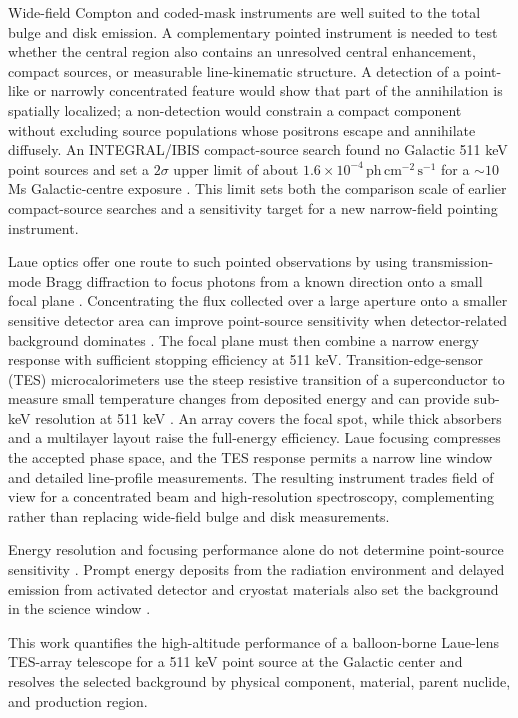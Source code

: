 \documentclass[11pt]{article}
\newcommand{\phcms}{\ensuremath{\,\mathrm{ph\,cm^{-2}\,s^{-1}}}}
\begin{document}
Wide-field Compton and coded-mask instruments are well suited to the total
bulge and disk emission. A complementary pointed instrument is needed to test
whether the central region also contains an unresolved central enhancement,
compact sources, or measurable line-kinematic structure. A detection of a
point-like or narrowly concentrated feature would show that part of the
annihilation is spatially localized; a non-detection would constrain a compact
component without excluding source populations whose positrons escape and
annihilate diffusely. An INTEGRAL/IBIS compact-source search found no Galactic
511 keV point sources and set a $2\sigma$ upper limit of about
$1.6\times10^{-4}\phcms$ for a $\sim10$ Ms Galactic-centre exposure
\cite{DeCesare2011}. This limit sets both the comparison scale of earlier
compact-source searches and a sensitivity target for a new narrow-field
pointing instrument.

Laue optics offer one route to such pointed observations by using
transmission-mode Bragg diffraction to focus photons from a known direction
onto a small focal plane \cite{Barriere2009Laue,Barriere2011LauePrototype}.
Concentrating the flux collected over a large aperture onto a smaller sensitive
detector area can improve point-source sensitivity when detector-related
background dominates \cite{Weidenspointner2006MAX}. The focal plane must then
combine a narrow energy response with sufficient stopping efficiency at
511 keV. Transition-edge-sensor (TES) microcalorimeters use the steep
resistive transition of a superconductor to measure small temperature changes
from deposited energy and can provide sub-keV resolution at 511 keV
\cite{Shirazi2023,Zhang2022TESGamma}. An array covers the focal spot, while thick absorbers and a
multilayer layout raise the full-energy efficiency. Laue focusing compresses
the accepted phase space, and the TES response permits a narrow line window and
detailed line-profile measurements. The resulting instrument trades field of
view for a concentrated beam and high-resolution spectroscopy, complementing
rather than replacing wide-field bulge and disk measurements.

Energy resolution and focusing performance alone do not determine point-source
sensitivity \cite{Shirazi2023,Hu2026}. Prompt energy deposits from the radiation
environment and delayed emission from activated detector and cryostat materials
also set the background in the science window
\cite{Gallego2025Balloon,Tian2026DIXE}.

This work quantifies the high-altitude performance of a balloon-borne
Laue-lens TES-array telescope for a 511 keV point source at the Galactic center
and resolves the selected background by physical component, material, parent
nuclide, and production region.
\end{document}
